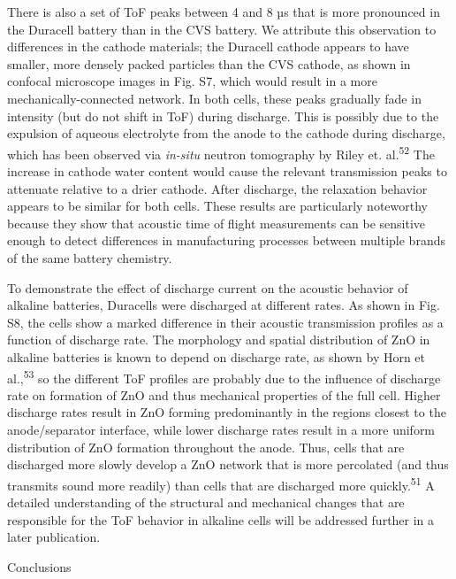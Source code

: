 \documentclass[]{article}
\begin{document}
{ }There is also a set of ToF peaks between 4 and 8 µs that is more
pronounced in the Duracell battery than in the CVS battery. We attribute
this observation to differences in the cathode materials; the Duracell
cathode appears to have smaller, more densely packed particles than the
CVS cathode, as shown in confocal microscope images in Fig. S7, which
would result in a more mechanically-connected network. In both cells,
these peaks gradually fade in intensity (but do not shift in ToF) during
discharge. This is possibly due to the expulsion of aqueous electrolyte
from the anode to the cathode during discharge, which has been observed
via \emph{in-situ} neutron tomography by Riley et.
al.\textsuperscript{52} The increase in cathode water content would
cause the relevant transmission peaks to attenuate relative to a drier
cathode. After discharge, the relaxation behavior appears to be similar
for both cells. These results are particularly noteworthy because they
show that acoustic time of flight measurements can be sensitive enough
to detect differences in manufacturing processes between multiple brands
of the same battery chemistry.{~}

{ }To demonstrate the effect of discharge current on the acoustic
behavior of alkaline batteries, Duracells were discharged at different
rates. As shown in Fig. S8, the cells show a marked difference in their
acoustic transmission profiles as a function of discharge rate. The
morphology and spatial distribution of ZnO in alkaline batteries is
known to depend on discharge rate, as shown by Horn et
al.,\textsuperscript{53} so the different ToF profiles are probably due
to the influence of discharge rate on formation of ZnO and thus
mechanical properties of the full cell. Higher discharge rates result in
ZnO forming predominantly in the regions closest to the anode/separator
interface, while lower discharge rates result in a more uniform
distribution of ZnO formation throughout the anode. Thus, cells that are
discharged more slowly develop a ZnO network that is more percolated
(and thus transmits sound more readily) than cells that are discharged
more quickly.\textsuperscript{51} A detailed understanding of the
structural and mechanical changes that are responsible for the ToF
behavior in alkaline cells will be addressed further in a later
publication.

Conclusions
\end{document}
